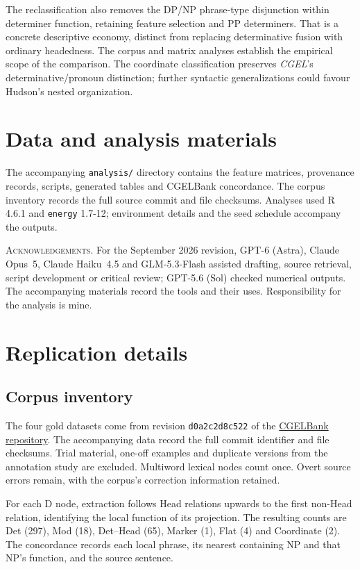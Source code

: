 \documentclass[12pt]{article}
\begin{document}
The reclassification also removes the DP/NP phrase-type disjunction within determiner function, retaining feature selection and PP determiners. That is a concrete descriptive economy, distinct from replacing determinative fusion with ordinary headedness. The corpus and matrix analyses establish the empirical scope of the comparison. The coordinate classification preserves \textit{CGEL}'s determinative/pronoun distinction; further syntactic generalizations could favour Hudson's nested organization.

\section*{Data and analysis materials}

The accompanying \texttt{analysis/} directory contains the feature matrices, provenance records, scripts, generated tables and CGELBank concordance. The corpus inventory records the full source commit and file checksums. Analyses used R 4.6.1 and \texttt{energy} 1.7-12; environment details and the seed schedule accompany the outputs.

\vspace{0.5\baselineskip}
\noindent\textsc{Acknowledgements.} For the September 2026 revision, GPT-6 (Astra), Claude Opus~5, Claude Haiku~4.5 and GLM-5.3-Flash assisted drafting, source retrieval, script development or critical review; GPT-5.6 (Sol) checked numerical outputs. The accompanying materials record the tools and their uses. Responsibility for the analysis is mine.

\appendix
\section{Replication details}\label{app:replication}

\subsection{Corpus inventory}

The four gold datasets come from revision \texttt{d0a2c2d8c522} of the \href{https://github.com/nert-nlp/cgel}{CGELBank repository}. The accompanying data record the full commit identifier and file checksums. Trial material, one-off examples and duplicate versions from the annotation study are excluded. Multiword lexical nodes count once. Overt source errors remain, with the corpus's correction information retained.

For each D node, extraction follows Head relations upwards to the first non-Head relation, identifying the local function of its projection. The resulting counts are Det (297), Mod (18), Det--Head (65), Marker (1), Flat (4) and Coordinate (2). The concordance records each local phrase, its nearest containing NP and that NP's function, and the source sentence.
\end{document}
